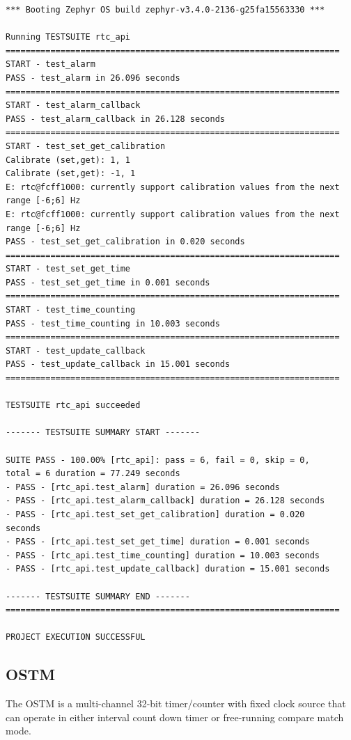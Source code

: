 \documentclass[11pt,a4paper,oneside]{article}
\begin{document}
\begin{lstlisting}
*** Booting Zephyr OS build zephyr-v3.4.0-2136-g25fa15563330 ***

Running TESTSUITE rtc_api
===================================================================
START - test_alarm
PASS - test_alarm in 26.096 seconds
===================================================================
START - test_alarm_callback
PASS - test_alarm_callback in 26.128 seconds
===================================================================
START - test_set_get_calibration
Calibrate (set,get): 1, 1
Calibrate (set,get): -1, 1
E: rtc@fcff1000: currently support calibration values from the next
range [-6;6] Hz
E: rtc@fcff1000: currently support calibration values from the next
range [-6;6] Hz
PASS - test_set_get_calibration in 0.020 seconds
===================================================================
START - test_set_get_time
PASS - test_set_get_time in 0.001 seconds
===================================================================
START - test_time_counting
PASS - test_time_counting in 10.003 seconds
===================================================================
START - test_update_callback
PASS - test_update_callback in 15.001 seconds
===================================================================

TESTSUITE rtc_api succeeded

------- TESTSUITE SUMMARY START -------

SUITE PASS - 100.00% [rtc_api]: pass = 6, fail = 0, skip = 0,
total = 6 duration = 77.249 seconds
- PASS - [rtc_api.test_alarm] duration = 26.096 seconds
- PASS - [rtc_api.test_alarm_callback] duration = 26.128 seconds
- PASS - [rtc_api.test_set_get_calibration] duration = 0.020
seconds
- PASS - [rtc_api.test_set_get_time] duration = 0.001 seconds
- PASS - [rtc_api.test_time_counting] duration = 10.003 seconds
- PASS - [rtc_api.test_update_callback] duration = 15.001 seconds

------- TESTSUITE SUMMARY END -------
===================================================================

PROJECT EXECUTION SUCCESSFUL
\end{lstlisting}

\subsection{OSTM}\label{ostm}

The OSTM is a multi-channel 32-bit timer/counter with fixed clock source
that can operate in either interval count down timer or free-running
compare match mode.
\end{document}
